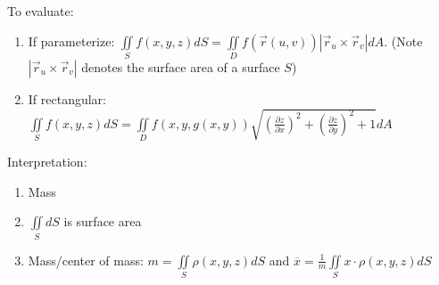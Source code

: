 \documentclass[../calc3.tex]{subfiles}
\begin{document}
To evaluate:
\begin{enumerate}
    \item If parameterize: $\iint\limits_{S}f(x,y,z)dS = \iint\limits_{D}f(\vec{r}(u,v))|\vec{r}_u\times \vec{r}_v|dA$. (Note $|\vec{r}_u\times \vec{r}_v|$ denotes the surface area of a surface $S$)
    \item If rectangular: $\iint\limits_{S}f(x,y,z)dS = \iint\limits_{D}f(x,y,g(x,y))\sqrt{\left(\frac{\partial z}{\partial x}\right)^2 + \left(\frac{\partial z}{\partial y}\right)^2 + 1}dA$
\end{enumerate}

Interpretation:
\begin{enumerate}
    \item Mass 
    \item $\iint\limits_{S}dS$ is surface area 
    \item Mass/center of mass: $m=\iint\limits_{S}\rho(x,y,z)dS$ and $\overline{x}=\frac{1}{m}\iint\limits_{S}x\cdot \rho(x,y,z)dS$
\end{enumerate}
\end{document}
